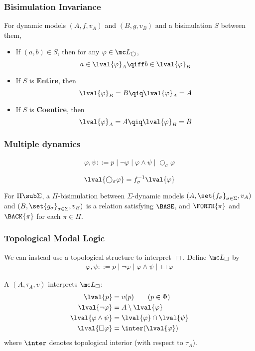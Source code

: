 {    \begin{frame}
        \frametitle{Bisimulation Invariance}
         For dynamic models $(A,f,v_A)$ and $(B,g,v_B)$ and a bisimulation $S$ between them,
            \begin{itemize}
                \item If $(a,b)\in S$, then for any $\varphi\in\mc L_{\bigcirc}$,
                        \[ a\in\lval{\varphi}_A \qiff b\in\lval{\varphi}_B \]\pause
                    \item \vspace{-0.5cm}If $S$ is \textbf{Entire}, then
                    \[ \lval{\varphi}_B=B \qiq \lval{\varphi}_A=A \]\pause
                \item \vspace{-0.5cm} If $S$ is \textbf{Coentire}, then
                    \[ \lval{\varphi}_A=A \qiq \lval{\varphi}_B=B \]
            \end{itemize}
    \end{frame}

    \begin{frame}
        \frametitle{Multiple dynamics}
        \begin{align*}
            \varphi,\psi ::= p \mid \neg\varphi \mid \varphi\land\psi \mid \bigcirc_{\sigma}\varphi \tag{$p\in\Phi$, $\sigma\in\Sigma$}
        \end{align*}\pause

        \[ \lval{\bigcirc_{\sigma}\varphi} = f_{\sigma}^{-1}\lval{\varphi} \]\pause

        For $\Pi\sub\Sigma$, a $\Pi$-bisimulation between $\Sigma$-dynamic models $(A,\set{f_{\sigma}}_{\sigma\in\Sigma},v_A)$ and $(B,\set{g_{\sigma}}_{\sigma\in\Sigma},v_B)$ is a relation satisfying $\BASE$, and $\FORTH{\pi}$ and $\BACK{\pi}$ for each $\pi\in\Pi$.
    \end{frame}

    \begin{frame}
        \frametitle{Topological Modal Logic}
        We can instead use a topological structure to interpret $\Box$. Define $\mc L_{\Box}$ by
            \begin{align*}
                \varphi,\psi ::= p \mid \neg\varphi \mid \varphi\land\psi \mid \Box\varphi \tag{$p\in\Phi$}
            \end{align*}\pause

        A  $(A,\tau_A,v)$ interprets $\mc L_{\Box}$:
        \begin{align*}
            \lval{p} &= v(p) \tag{$p\in\Phi$}\\
            \lval{\neg\varphi} &= A\setminus\lval{\varphi}\\
            \lval{\varphi\land\psi} &= \lval{\varphi}\cap\lval{\psi}\\
            \lval{\Box\varphi} &= \inter(\lval{\varphi})
        \end{align*}
        where $\inter$ denotes topological interior (with respect to $\tau_A$).


\end{frame}}
